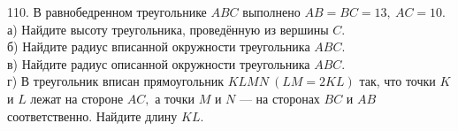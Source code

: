 110. В равнобедренном треугольнике $ABC$ выполнено $AB=BC=13,\ AC=10.$\\
а) Найдите высоту треугольника, проведённую из вершины $C.$\\
б) Найдите радиус вписанной окружности треугольника $ABC.$\\
в) Найдите радиус описанной окружности треугольника $ABC.$\\
г) В треугольник вписан прямоугольник $KLMN\ (LM=2KL)$ так, что точки $K$ и $L$ лежат на стороне $AC,$ а точки $M$ и $N$ --- на сторонах $BC$ и $AB$ соответственно. Найдите длину $KL.$\\
